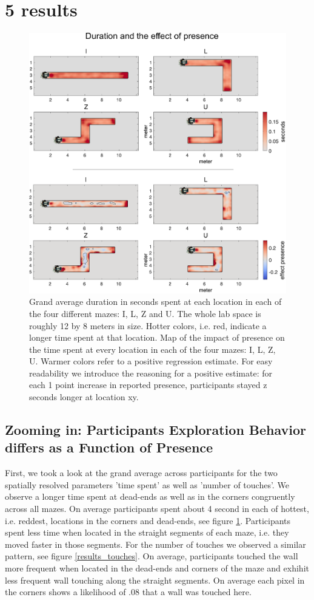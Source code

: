 \section{5 results}

\begin{figure}[h]
\centering
\includegraphics[width=.6\linewidth]{figures/duration.pdf}
\vspace{0pt}
\caption{Grand average duration in seconds spent at each location in each of the four different mazes: I, L, Z and U. The whole lab space is roughly 12 by 8 meters in size. Hotter colors, i.e. red, indicate a longer time spent at that location. Map of the impact of presence on the time spent at every location in each of the four mazes: I, L, Z, U. Warmer colors refer to a positive regression estimate. For easy readability we introduce the reasoning for a positive estimate: for each 1 point increase in reported presence, participants stayed z seconds longer at location xy.}
\label{results_duration}
\end{figure}

\subsection{Zooming in: Participants Exploration Behavior differs as a Function of Presence} First, we took a look at the grand average across participants for the two spatially resolved parameters 'time spent' as well as 'number of touches'. We observe a longer time spent at dead-ends as well as in the corners congruently across all mazes. On average participants spent about 4 second in each of hottest, i.e. reddest, locations in the corners and dead-ends, see figure \ref{results_duration}. Participants spent less time when located in the straight segments of each maze, i.e. they moved faster in those segments. For the number of touches we observed a similar pattern, see figure \ref{results_touches}. On average, participants touched the wall more frequent when located in the dead-ends and corners of the maze and exhihit less frequent wall touching along the straight segments. On average each pixel in the corners shows a likelihood of .08 that a wall was touched here.

